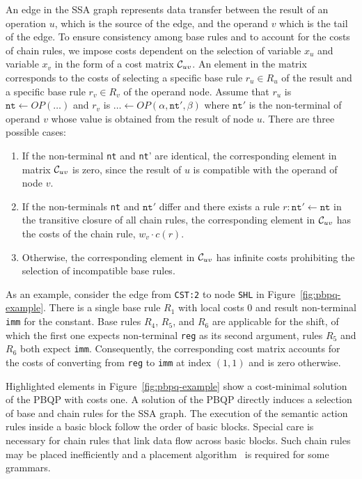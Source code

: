 An edge in the SSA graph represents data transfer between the result
of an operation $u$, which is the source of the edge, and the operand
$v$ which is the tail of the edge.  To ensure consistency among base
rules and to account for the costs of chain rules, we impose costs
dependent on the selection of variable $x_u$ and variable $x_v$ in the
form of a cost matrix $\mathcal C_{uv}$. An element in the matrix
corresponds to the costs of selecting a specific base rule $r_u \in
R_u$ of the result and a specific base rule $r_v \in R_v$ of the
operand node. Assume that $r_u $ is $\texttt{nt} \leftarrow
\textit{OP} (\dots)$ and $r_v$ is $\dots \leftarrow \textit{OP}
(\alpha, \texttt{nt}', \beta)$ where $\texttt{nt}'$ is the
non-terminal of operand $v$ whose value is obtained from the result of
node $u$. There are three possible cases:
\begin{enumerate}
\item If the non-terminal \texttt{nt} and \texttt{nt}' are identical,
  the corresponding element in matrix $\mathcal C_{uv}$ is zero,
  since the result of $u$ is compatible with the operand of node $v$.
\item If the non-terminals \texttt{nt} and $\texttt{nt}'$ differ and
  there exists a rule $r: \texttt{nt}' \leftarrow \texttt{nt}$ in the
  transitive closure of all chain rules, the corresponding element in
  $\mathcal C_{uv}$ has the costs of the chain rule, \ie $w_v \cdot
  c(r)$.
\item Otherwise, the corresponding element in $\mathcal C_{uv}$ has
  infinite costs prohibiting the selection of incompatible base rules.
\end{enumerate}

As an example, consider the edge from \texttt{CST:2} to node
\texttt{SHL} in Figure~\ref{fig:pbpq-example}. There is a single base
rule $R_1$ with local costs 0 and result non-terminal \texttt{imm} for
the constant. Base rules $R_4$, $R_5$, and $R_6$ are applicable for
the shift, of which the first one expects non-terminal \texttt{reg} as
its second argument, rules $R_5$ and $R_6$ both expect
\texttt{imm}. Consequently, the corresponding cost matrix accounts for
the costs of converting from \texttt{reg} to \texttt{imm} at index
$(1,1)$ and is zero otherwise.

Highlighted elements in Figure~\ref{fig:pbpq-example} show a
cost-minimal solution of the PBQP with costs one. A solution of the
PBQP directly induces a selection of base and chain rules for the SSA
graph. The execution of the semantic action rules inside a basic block
follow the order of basic blocks. Special care is necessary for chain rules 
that link data flow across basic blocks. Such chain rules may be placed
inefficiently and a placement algorithm~\cite{1269857} is required for
some grammars. 

